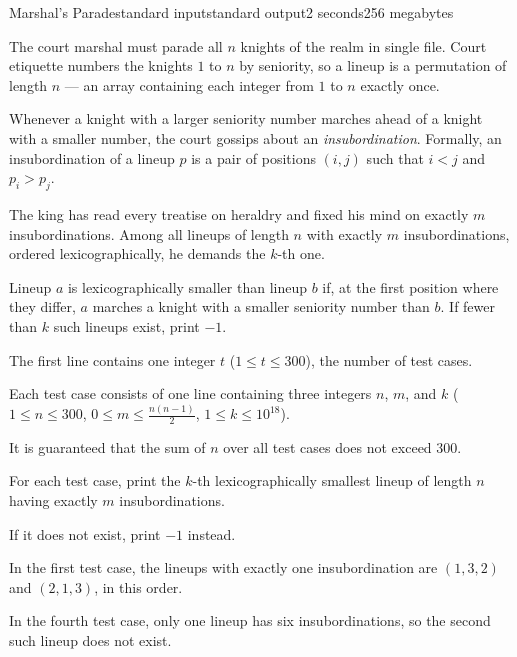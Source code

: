 \begin{problem}{Marshal's Parade}{standard input}{standard output}{2 seconds}{256 megabytes}

The court marshal must parade all $n$ knights of the realm in single file. Court etiquette numbers the knights $1$ to $n$ by seniority, so a lineup is a permutation of length $n$ --- an array containing each integer from $1$ to $n$ exactly once.

Whenever a knight with a larger seniority number marches ahead of a knight with a smaller number, the court gossips about an \emph{insubordination}. Formally, an insubordination of a lineup $p$ is a pair of positions $(i,j)$ such that $i<j$ and $p_i>p_j$.

The king has read every treatise on heraldry and fixed his mind on exactly $m$ insubordinations. Among all lineups of length $n$ with exactly $m$ insubordinations, ordered lexicographically, he demands the $k$-th one.

Lineup $a$ is lexicographically smaller than lineup $b$ if, at the first position where they differ, $a$ marches a knight with a smaller seniority number than $b$.
If fewer than $k$ such lineups exist, print $-1$.


\InputFile
The first line contains one integer $t$ ($1 \le t \le 300$), the number of test cases.

Each test case consists of one line containing three integers $n$, $m$, and $k$ ($1 \le n \le 300$, $0 \le m \le \frac{n(n-1)}{2}$, $1 \le k \le 10^{18}$).

It is guaranteed that the sum of $n$ over all test cases does not exceed $300$.


\OutputFile
For each test case, print the $k$-th lexicographically smallest lineup of length $n$ having exactly $m$ insubordinations.

If it does not exist, print $-1$ instead.


\Example

\begin{example}
%
\end{example}

\Note
In the first test case, the lineups with exactly one insubordination are $(1,3,2)$ and $(2,1,3)$, in this order.

In the fourth test case, only one lineup has six insubordinations, so the second such lineup does not exist.


\end{problem}

